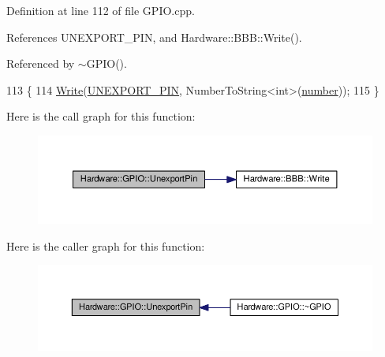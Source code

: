 Definition at line 112 of file G\+P\+I\+O.\+cpp.



References U\+N\+E\+X\+P\+O\+R\+T\+\_\+\+P\+I\+N, and Hardware\+::\+B\+B\+B\+::\+Write().



Referenced by $\sim$\+G\+P\+I\+O().


\begin{DoxyCode}
113     \{
114         \hyperlink{class_hardware_1_1_b_b_b_a155cc06f76d82a6b690ce5ea08e7c68e}{Write}(\hyperlink{_g_p_i_o_8h_a57a9168261422a24cc4b062b0376449b}{UNEXPORT\_PIN}, NumberToString<int>(\hyperlink{class_hardware_1_1_g_p_i_o_a1671a87bb70911b0a6a29019a068cf96}{number}));
115     \}
\end{DoxyCode}


Here is the call graph for this function\+:\nopagebreak
\begin{figure}[H]
\begin{center}
\leavevmode
\includegraphics[width=350pt]{class_hardware_1_1_g_p_i_o_ad56e9d73869a8dacc3245e33df4f5d24_cgraph}
\end{center}
\end{figure}




Here is the caller graph for this function\+:\nopagebreak
\begin{figure}[H]
\begin{center}
\leavevmode
\includegraphics[width=350pt]{class_hardware_1_1_g_p_i_o_ad56e9d73869a8dacc3245e33df4f5d24_icgraph}
\end{center}
\end{figure}


\hypertarget{class_hardware_1_1_g_p_i_o_afd1340f1a1907168e7dc4ad24027b96a}{}
